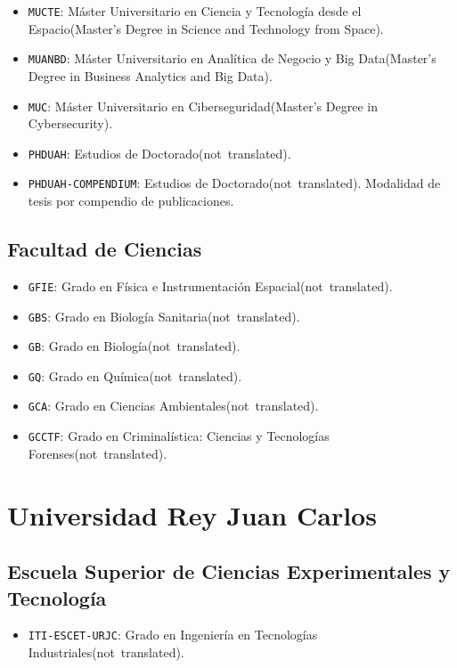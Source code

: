 \begin {itemize}
\item \texttt {MUCTE}: Máster Universitario en Ciencia y Tecnología desde el Espacio\nobreakspace {}(Master's Degree in Science and Technology from Space).
\item \texttt {MUANBD}: Máster Universitario en Analítica de Negocio y Big Data\nobreakspace {}(Master's Degree in Business Analytics and Big Data).
\item \texttt {MUC}: Máster Universitario en Ciberseguridad\nobreakspace {}(Master's Degree in Cybersecurity).
\item \texttt {PHDUAH}: Estudios de Doctorado\nobreakspace {}(\mbox {not translated}).
\item \texttt {PHDUAH-COMPENDIUM}: Estudios de Doctorado\nobreakspace {}(\mbox {not translated}). Modalidad de tesis por compendio de publicaciones.
\end {itemize}
\subsection {Facultad de Ciencias}
\begin {itemize}
\item \texttt {GFIE}: Grado en Física e Instrumentación Espacial\nobreakspace {}(\mbox {not translated}).
\item \texttt {GBS}: Grado en Biología Sanitaria\nobreakspace {}(\mbox {not translated}).
\item \texttt {GB}: Grado en Biología\nobreakspace {}(\mbox {not translated}).
\item \texttt {GQ}: Grado en Química\nobreakspace {}(\mbox {not translated}).
\item \texttt {GCA}: Grado en Ciencias Ambientales\nobreakspace {}(\mbox {not translated}).
\item \texttt {GCCTF}: Grado en Criminalística: Ciencias y Tecnologías Forenses\nobreakspace {}(\mbox {not translated}).
\end {itemize}
\section {Universidad Rey Juan Carlos}
\subsection {Escuela Superior de Ciencias Experimentales y Tecnología}
\begin {itemize}
\item \texttt {ITI-ESCET-URJC}: Grado en Ingeniería en Tecnologías Industriales\nobreakspace {}(\mbox {not translated}).
\end {itemize}
